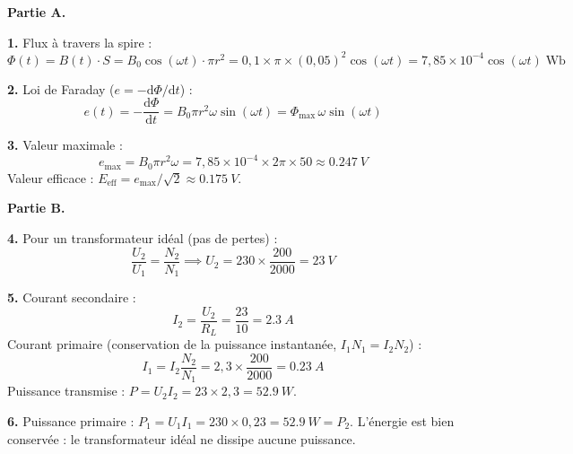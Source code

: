 \documentclass[12pt,a4paper]{article}
\begin{document}
\begin{boitecorrige}
\textbf{Partie A.}

\textbf{1.} Flux à travers la spire :
\[
\Phi(t) = B(t)\cdot S = B_0\cos(\omega t)\cdot\pi r^2 = 0{,}1\times\pi\times(0{,}05)^2\cos(\omega t) = 7{,}85\times10^{-4}\cos(\omega t)\;\text{Wb}
\]

\textbf{2.} Loi de Faraday ($e = -\mathrm{d}\Phi/\mathrm{d}t$) :
\[
e(t) = -\frac{\mathrm{d}\Phi}{\mathrm{d}t} = B_0\pi r^2\omega\sin(\omega t) = \Phi_\text{max}\,\omega\sin(\omega t)
\]

\textbf{3.} Valeur maximale :
\[
e_\text{max} = B_0\pi r^2\omega = 7{,}85\times10^{-4}\times2\pi\times50 \approx \qty{0.247}{V}
\]
Valeur efficace : $E_\text{eff} = e_\text{max}/\sqrt{2} \approx \qty{0.175}{V}$.

\textbf{Partie B.}

\textbf{4.} Pour un transformateur idéal (pas de pertes) :
\[
\frac{U_2}{U_1} = \frac{N_2}{N_1} \implies U_2 = 230\times\frac{200}{2000} = \qty{23}{V}
\]

\textbf{5.} Courant secondaire :
\[
I_2 = \frac{U_2}{R_L} = \frac{23}{10} = \qty{2.3}{A}
\]
Courant primaire (conservation de la puissance instantanée, $I_1N_1=I_2N_2$) :
\[
I_1 = I_2\frac{N_2}{N_1} = 2{,}3\times\frac{200}{2000} = \qty{0.23}{A}
\]
Puissance transmise : $P = U_2 I_2 = 23\times2{,}3 = \qty{52.9}{W}$.

\textbf{6.} Puissance primaire : $P_1 = U_1 I_1 = 230\times0{,}23 = \qty{52.9}{W} = P_2$. L'énergie est bien conservée : le transformateur idéal ne dissipe aucune puissance.
\end{boitecorrige}

\ifdefined\inMainDoc\else
\end{document}
